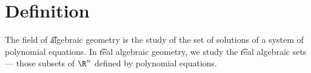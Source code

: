 
\section*{Definition}

The field of \t{algebraic geometry} is the study of the set of solutions of a system of polynomial equations.
In \t{real algebraic geometry}, we study the \t{real algebraic sets} --- those subsets of $\R ^n$ defined by polynomial equations.

\blankpage
